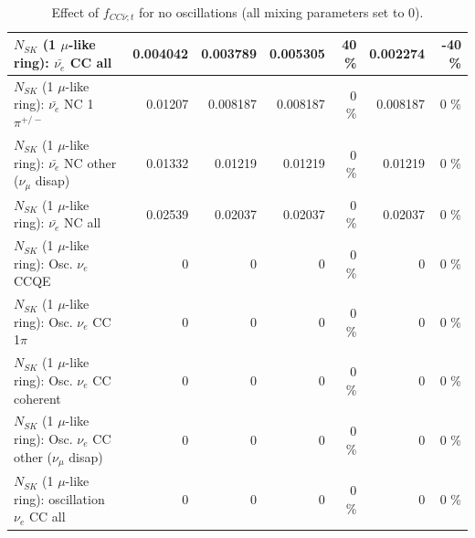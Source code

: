 \begin{table}
\begin{tabular}{| l | r | r | r  r | r  r |}
                            $N_{SK}$ (1 $\mu$-like ring): $\bar{\nu_{e}}$ CC all &        0.004042 &        0.003789 &        0.005305 &       40 \%  &        0.002274 &      -40 \%  \\ 
\hline
                     $N_{SK}$ (1 $\mu$-like ring): $\bar{\nu_e}$ NC 1$\pi^{+/-}$ &         0.01207 &        0.008187 &        0.008187 &        0 \%  &        0.008187 &        0 \%  \\ 
          $N_{SK}$ (1 $\mu$-like ring): $\bar{\nu_e}$ NC other ($\nu_\mu$ disap) &         0.01332 &         0.01219 &         0.01219 &        0 \%  &         0.01219 &        0 \%  \\ 
                            $N_{SK}$ (1 $\mu$-like ring): $\bar{\nu_{e}}$ NC all &         0.02539 &         0.02037 &         0.02037 &        0 \%  &         0.02037 &        0 \%  \\ 
\hline
\hline
\hline
                                 $N_{SK}$ (1 $\mu$-like ring): Osc. $\nu_e$ CCQE &               0 &               0 &               0 &        0 \%  &               0 &        0 \%  \\ 
                            $N_{SK}$ (1 $\mu$-like ring): Osc. $\nu_e$ CC 1$\pi$ &               0 &               0 &               0 &        0 \%  &               0 &        0 \%  \\ 
                          $N_{SK}$ (1 $\mu$-like ring): Osc. $\nu_e$ CC coherent &               0 &               0 &               0 &        0 \%  &               0 &        0 \%  \\ 
           $N_{SK}$ (1 $\mu$-like ring): Osc. $\nu_e$ CC other ($\nu_\mu$ disap) &               0 &               0 &               0 &        0 \%  &               0 &        0 \%  \\ 
                        $N_{SK}$ (1 $\mu$-like ring): oscillation $\nu_e$ CC all &               0 &               0 &               0 &        0 \%  &               0 &        0 \%  \\ 
\hline
\hline
\end{tabular}
\caption{ Effect of $f_{CC\bar{\nu}; t}$ for no oscillations (all mixing parameters set to 0). }
\label{tab:num_xsec_norm_antinutonu_1RmuT_3f_osc_t13:0}
\end{table}
\clearpage
